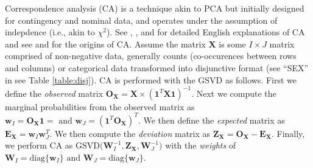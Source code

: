 \documentclass[12pt]{article}
\begin{document}
Correspondence analysis (CA) is a technique akin to PCA but initially
designed for contingency and nominal data, and operates under the
assumption of indepdence (i.e., akin to \(\chi^2\)). See
\citet{greenacre_theory_1984}, \citet{greenacre_correspondence_2010-1},
and \citet{lebart_multivariate_1984} for detailed English explanations
of CA and see \citet{escofier-cordier_analyse_1965} and
\citet{benzecri_analyse_1973} for the origins of CA. Assume the matrix
\({\mathbf X}\) is some \(I \times J\) matrix comprised of non-negative
data, generally counts (co-occurences between rows and columns) or
categorical data transformed into disjunctive format (see ``SEX'' in see
Table \ref{table:disj}). CA is performed with the GSVD as follows. First
we define the \emph{observed} matrix
\({\mathbf O}_{\mathbf X} = {\mathbf X} \times ({\mathbf 1}^{T}{\mathbf X} {\mathbf 1})^{-1}\).
Next we compute the marginal probabilities from the observed matrix as
\({\mathbf w}_{I} = {\mathbf O}_{\mathbf X}{\mathbf 1} = \text{ and } {\mathbf w}_{J} = ({\mathbf 1}^{T}{\mathbf O}_{\mathbf X})^{T}\).
We then define the \emph{expected} matrix as
\({\mathbf E}_{\mathbf X} = {\mathbf w}_{I}{\mathbf w}_{J}^{T}\). We
then compute the \emph{deviation} matrix as
\({\mathbf Z}_{\mathbf X} = {\mathbf O}_{\mathbf X} - {\mathbf E}_{\mathbf X}\).
Finally, we perform CA as
\(\mathrm{GSVD(} {\mathbf W}_{I}^{-1}, {\mathbf Z}_{\mathbf X}, {\mathbf W}_{J}^{-1} \mathrm{)}\)
with the \emph{weights} of
\({\mathbf W}_{I} = \mathrm{diag\{} {\mathbf w}_{I} \mathrm{\}} \text{ and } {\mathbf W}_{J} = \mathrm{diag\{} {\mathbf w}_{J} \mathrm{\}}\).
\end{document}
